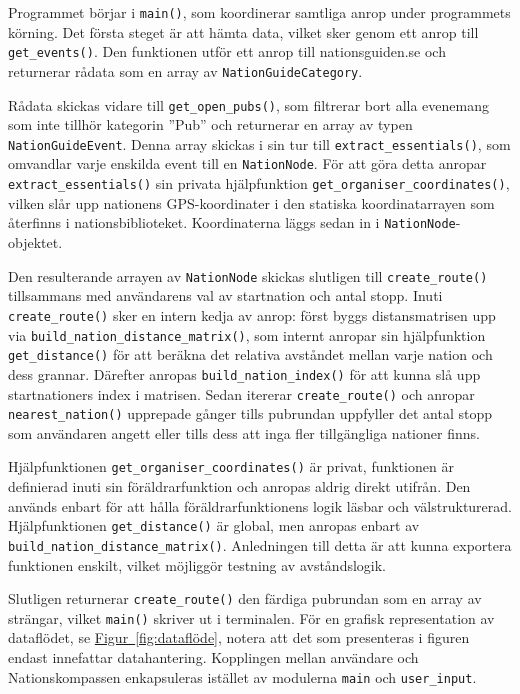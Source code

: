 \documentclass[a4paper, 12pt]{article}
\begin{document}
        Programmet börjar i \texttt{main()}, som koordinerar samtliga anrop under programmets körning. Det första steget är att hämta data, vilket sker genom ett anrop till \texttt{get\_events()}. Den funktionen utför ett anrop till nationsguiden.se och returnerar rådata som en array av \texttt{NationGuideCategory}.


        Rådata skickas vidare till \texttt{get\_open\_pubs()}, som filtrerar bort alla evenemang som inte tillhör kategorin ''Pub'' och returnerar en array av typen \texttt{NationGuideEvent}. Denna array skickas i sin tur till \texttt{extract\_essentials()}, som omvandlar varje enskilda event till en \texttt{NationNode}. För att göra detta anropar \texttt{extract\_essentials()} sin privata hjälpfunktion \texttt{get\_organiser\_coordinates()}, vilken slår upp nationens GPS-koordinater i den statiska koordinatarrayen som återfinns i nationsbiblioteket. Koordinaterna läggs sedan in i \texttt{NationNode}-objektet.


        Den resulterande arrayen av \texttt{NationNode} skickas slutligen till \texttt{create\_route()} tillsammans med användarens val av startnation och antal stopp. Inuti \texttt{create\_route()} sker en intern kedja av anrop: först byggs distansmatrisen upp via \texttt{build\_nation\_distance\_matrix()}, som internt anropar sin hjälpfunktion \texttt{get\_distance()} för att beräkna det relativa avståndet mellan varje nation och dess grannar. Därefter anropas \texttt{build\_nation\_index()} för att kunna slå upp startnationers index i matrisen. Sedan itererar \texttt{create\_route()} och anropar \texttt{nearest\_nation()} upprepade gånger tills pubrundan uppfyller det antal stopp som användaren angett eller tills dess att inga fler tillgängliga nationer finns.


        Hjälpfunktionen \texttt{get\_organiser\_coordinates()} är privat, funktionen är definierad inuti sin föräldrarfunktion och anropas aldrig direkt utifrån. Den används enbart för att hålla föräldrarfunktionens logik läsbar och välstrukturerad. Hjälpfunktionen \texttt{get\_distance()} är global, men anropas enbart av \texttt{build\_nation\_distance\_matrix()}. Anledningen till detta är att kunna exportera funktionen enskilt, vilket möjliggör testning av avståndslogik.


        Slutligen returnerar \texttt{create\_route()} den färdiga pubrundan som en array av strängar, vilket \texttt{main()} skriver ut i terminalen. För en grafisk representation av dataflödet, se \hyperref[fig:dataflöde]{Figur~\ref*{fig:dataflöde}}, notera att det som presenteras i figuren endast innefattar datahantering. Kopplingen mellan användare och Nationskompassen enkapsuleras istället av modulerna \texttt{main} och \texttt{user\_input}.
\end{document}
